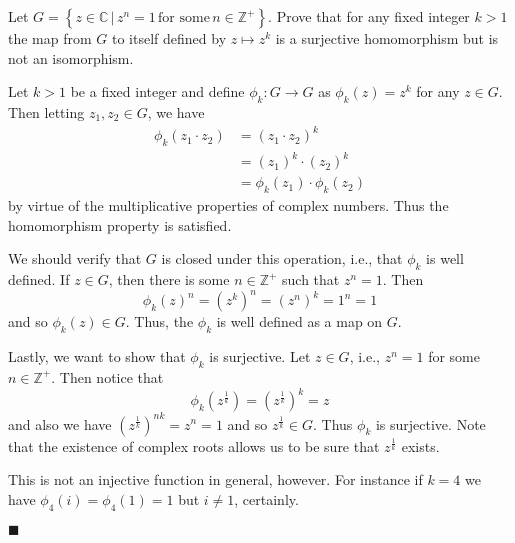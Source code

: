 \documentclass[12pt]{article}
\renewcommand{\qed}{\hfill$\blacksquare$}
\renewenvironment{proof}{\begin{addmargin}[1em]{0em}\begin{newproof}}{\end{newproof}\end{addmargin}\qed}
\newenvironment{problem}[2][Exercise]{\begin{trivlist}
\item[\hskip \labelsep {\bfseries #1}\hskip \labelsep {\bfseries #2.}]}{\end{trivlist}}
\begin{document}
\begin{problem}{1.6.19}
Let $G=\left\{z\in\mathbb{C}\, | \, z^n=1 \, \text{for some} \, n\in \mathbb{Z}^+\right\}$. Prove that for any fixed integer $k>1$ the map from $G$ to itself defined by $z\mapsto z^k$ is a surjective homomorphism but is not an isomorphism.
\end{problem}
\begin{proof}
Let $k>1$ be a fixed integer and define $\phi_k:G\rightarrow G$ as $\phi_k\left(z\right) = z^k$ for any $z\in G$. Then letting $z_1,z_2 \in G$, we have
\begin{equation*}
    \begin{split}
        \phi_k\left(z_1\cdot z_2\right) & = \left(z_1\cdot z_2\right)^k \\
        & = \left(z_1\right)^k \cdot \left(z_2\right)^k \\
        & = \phi_k\left(z_1\right) \cdot \phi_k\left(z_2\right)
    \end{split}
\end{equation*}
by virtue of the multiplicative properties of complex numbers. Thus the homomorphism property is satisfied.

We should verify that $G$ is closed under this operation, i.e., that $\phi_k$ is well defined. If $z\in G$, then there is some $n\in \mathbb{Z}^+$ such that $z^n=1$. Then
$$ \phi_k\left(z\right)^n = \left(z^k\right)^n =\left(z^n\right)^k = 1^n = 1 $$
and so $\phi_k\left(z\right)\in G$. Thus, the $\phi_k$ is well defined as a map on $G$.

Lastly, we want to show that $\phi_k$ is surjective. Let $z\in G$, i.e., $z^n=1$ for some $n\in \mathbb{Z}^+$. Then notice that
$$ \phi_k\left(z^{\frac{1}{k}}\right) = \left(z^{\frac{1}{k}}\right)^k = z $$ and also we have $\left(z^{\frac{1}{k}}\right)^{nk} = z^n = 1$ and so $z^{\frac{1}{k}}\in G$. Thus $\phi_k$ is surjective. Note that the existence of complex roots allows us to be sure that $z^{\frac{1}{k}}$ exists.

This is not an injective function in general, however. For instance if $k=4$ we have $\phi_4\left(i\right) = \phi_4\left(1\right) = 1$ but $i\neq 1$, certainly.
\end{proof}
\end{document}
